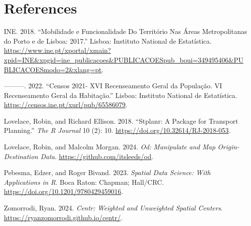 \documentclass[
  letterpaper,
  DIV=11,
  numbers=noendperiod]{scrreprt}
\newlength{\cslhangindent}
\newenvironment{CSLReferences}[2] %
 {\begin{list}{}{%
  \setlength{\itemindent}{0pt}
  \setlength{\leftmargin}{0pt}
  \setlength{\parsep}{0pt}
  \ifodd #1
   \setlength{\leftmargin}{\cslhangindent}
   \setlength{\itemindent}{-1\cslhangindent}
  \fi
  \setlength{\itemsep}{#2\baselineskip}}}
 {\end{list}}
\begin{document}

\chapter*{References}\label{references}


\label{refs}
\begin{CSLReferences}{1}{0}
INE. 2018. {``Mobilidade e Funcionalidade Do Território Nas {Áreas
Metropolitanas do Porto e de Lisboa}: 2017.''} Lisboa: {Instituto
National de Estatística}.
\url{https://www.ine.pt/xportal/xmain?xpid=INE&xpgid=ine_publicacoes&PUBLICACOESpub_boui=349495406&PUBLICACOESmodo=2&xlang=pt}.

---------. 2022. {``{Censos 2021- XVI Recenseamento Geral da População.
VI Recenseamento Geral da Habitação}.''} Lisboa: {Instituto National de
Estatística}. \url{https://censos.ine.pt/xurl/pub/65586079}.

Lovelace, Robin, and Richard Ellison. 2018. {``Stplanr: A Package for
Transport Planning.''} \emph{{The R Journal}} 10 (2): 10.
\url{https://doi.org/10.32614/RJ-2018-053}.

Lovelace, Robin, and Malcolm Morgan. 2024. \emph{Od: Manipulate and Map
Origin-Destination Data}. \url{https://github.com/itsleeds/od}.

Pebesma, Edzer, and Roger Bivand. 2023. \emph{Spatial Data Science: With
Applications in {R}}. Boca Raton: Chapman; Hall/CRC.
\url{https://doi.org/10.1201/9780429459016}.

Zomorrodi, Ryan. 2024. \emph{Centr: Weighted and Unweighted Spatial
Centers}. \url{https://ryanzomorrodi.github.io/centr/}.

\end{CSLReferences}
\end{document}
